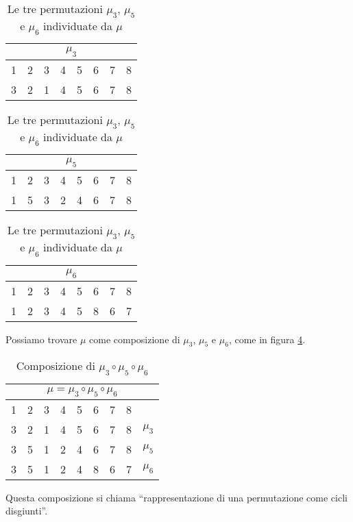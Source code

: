 \begin{table}[ht]
\centering
\begin{tabular}{*{8}{c}}
\multicolumn{8}{c}{$\mu_3$} \\
\hline
\cellcolor{green!20} 1 & 2 & \cellcolor{green!20} 3 & 4 & 5 & 6 & 7 & 8 \\
\cellcolor{green!20} 3 & 2 & \cellcolor{green!20} 1 & 4 & 5 & 6 & 7 & 8
\end{tabular}
\qquad
\begin{tabular}{*{8}{c}}
\multicolumn{8}{c}{$\mu_5$} \\
\hline
1 & \cellcolor{green!20} 2 & 3 & \cellcolor{green!20} 4 & \cellcolor{green!20} 5 & 6 & 7 & 8 \\
1 & \cellcolor{green!20} 5 & 3 & \cellcolor{green!20} 2 & \cellcolor{green!20} 4 & 6 & 7 & 8
\end{tabular}
\qquad
\begin{tabular}{*{8}{c}}
\multicolumn{8}{c}{$\mu_6$} \\
\hline
1 & 2 & 3 & 4 & 5 & \cellcolor{green!20} 6 & \cellcolor{green!20} 7 & \cellcolor{green!20} 8 \\
1 & 2 & 3 & 4 & 5 & \cellcolor{green!20} 8 & \cellcolor{green!20} 6 & \cellcolor{green!20} 7
\end{tabular}
\caption{Le tre permutazioni $\mu_3$, $\mu_5$ e $\mu_6$ individuate da $\mu$\label{tab:cicli_mu_scomposizioni}}
\end{table}

Possiamo trovare $\mu$ come composizione di $\mu_3$, $\mu_5$ e $\mu_6$, come in figura \ref{tab:cicli_mu_composizione}.
\begin{table}[ht]
\centering
\begin{tabular}{*{9}{c}}
\multicolumn{9}{c}{$\mu = \mu_3 \circ \mu_5 \circ \mu_6$} \\
\hline
1 & 2 & 3 & 4 & 5 & 6 & 7 & 8 & \\
\cellcolor{green!20} 3 & 2 & \cellcolor{green!20} 1 & 4 & 5 & 6 & 7 & 8 & $\mu_3$ \\
3 & \cellcolor{green!20} 5 & 1 & \cellcolor{green!20} 2 & \cellcolor{green!20} 4 & 6 & 7 & 8 & $\mu_5$ \\
3 & 5 & 1 & 2 & 4 & \cellcolor{green!20} 8 & \cellcolor{green!20} 6 & \cellcolor{green!20} 7 & $\mu_6$
\end{tabular}
\caption{Composizione di $\mu_3 \circ \mu_5 \circ \mu_6$\label{tab:cicli_mu_composizione}}
\end{table}
Questa composizione si chiama ``rappresentazione di una permutazione come cicli disgiunti''.


